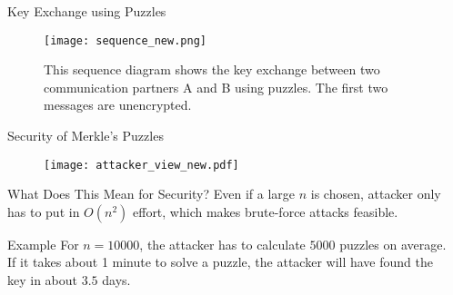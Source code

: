 \documentclass[final]{beamer}
\begin{document}
\begin{frame}[fragile]
\begin{columns}[t]
\begin{centercolumn}
 

      \begin{boxblock}{Key Exchange using Puzzles}
         \begin{figure}
              \vspace{0.05cm}
             \texttt{[image: sequence\_new.png]}
             \vspace{0.5cm}
            \caption{This sequence diagram shows the key exchange between two communication partners A and B using puzzles. The first two messages are unencrypted.}
         \end{figure}

      \end{boxblock}
  
       \begin{boxblock}{Security of Merkle's Puzzles}
  	\justifying
  	\begin{figure}
  		\centering
  		\texttt{[image: attacker\_view\_new.pdf]}
  		\vspace{0.4cm}
 
  	\end{figure}
   \begin{alertblock}{What Does This Mean for Security?}
   		\justifying
  	Even if a large $n$ is chosen, attacker only has to put in $O(n^2)$ effort, which makes brute-force attacks feasible.  \\
  \end{alertblock}
\vspace{0.36cm}
\begin{exampleblock}{Example}
	\justifying
	For $n=10 000$, the attacker has to calculate $5000$ puzzles on average. If it takes about 1 minute to solve a puzzle, the attacker will have found the key in about $3.5$ days.
\end{exampleblock}
  
  
  
  
  	
  \end{boxblock}



   \end{centercolumn} %
\fi


\begin{rightcolumn}
   

\end{rightcolumn}
\end{columns}
\end{frame}
\end{document}
